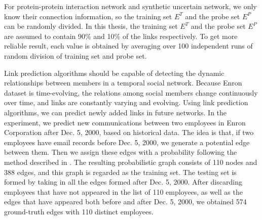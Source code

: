 \documentclass[\main/thesis.tex]{subfiles}
\begin{document}
For protein-protein interaction network and synthetic uncertain network, we only know their connection information, so the training set $E^T$ and the probe set $E^P$ can be randomly divided. In this thesis, the training set $E^T$ and the probe set $E^P$ are assumed to contain 90\% and 10\% of the links respectively. To get more reliable result, each value is obtained by averaging over 100 independent runs of random division of training set and probe set.

Link prediction algorithms should be capable of detecting the dynamic relationships between members in a temporal social network. Because Enron dataset is time-evolving, the relations among social members change continuously over time, and links are constantly varying and evolving. Using link prediction algorithms, we can predict newly added links in future networks. In the experiment, we predict new communications between two employees in Enron Corporation after Dec. 5, 2000, based on historical data. The idea is that, if two employees have email records before Dec. 5, 2000, we generate a potential edge between them. Then we assign these edges with a probability following the method described in  \cite{shetty2004enron}. The resulting probabilistic graph consists of 110 nodes and 388 edges, and this graph is regarded as the training set. The testing set is formed by taking in all the edges formed after Dec. 5, 2000. After discarding employees that have not appeared in the list of 110 employees, as well as the edges that have appeared both before and after Dec. 5, 2000, we obtained 574 ground-truth edges with 110 distinct employees.
\end{document}

